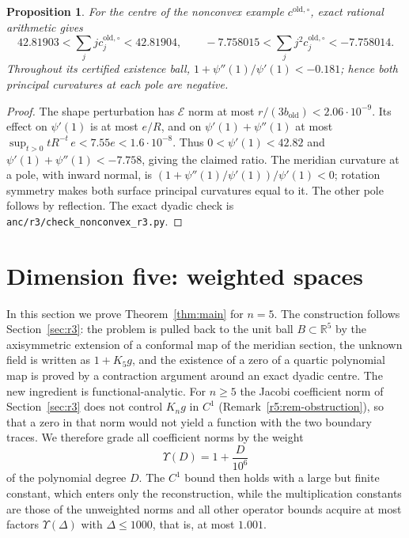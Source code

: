 \documentclass[11pt]{amsart}
\newtheorem{proposition}[theorem]{Proposition}
\theoremstyle{definition}
\theoremstyle{remark}
\numberwithin{equation}{section}
\newcommand{\R}{\mathbb{R}}
\begin{document}
\begin{proposition}\label{r3:prop-nonconvex}
For the centre of the nonconvex example $c^{\mathrm{old},\circ}$, exact rational arithmetic gives
\[
42.81903<\sum_jjc_j^{\mathrm{old},\circ}<42.81904,\qquad
-7.758015<\sum_jj^2c_j^{\mathrm{old},\circ}<-7.758014.
\]
Throughout its certified existence ball,
$1+\psi''(1)/\psi'(1)<-0.181$; hence both principal curvatures at each pole are negative.
\end{proposition}
\begin{proof}
The shape perturbation has $\mathcal E$ norm at most $r/(3b_{\mathrm{old}})<2.06\cdot10^{-9}$. Its effect on $\psi'(1)$ is at most $e/R$, and on $\psi'(1)+\psi''(1)$ at most $\sup_{t>0}tR^{-t}\,e<7.55e<1.6\cdot10^{-8}$. Thus $0<\psi'(1)<42.82$ and $\psi'(1)+\psi''(1)<-7.758$, giving the claimed ratio. The meridian curvature at a pole, with inward normal, is $(1+\psi''(1)/\psi'(1))/\psi'(1)<0$; rotation symmetry makes both surface principal curvatures equal to it. The other pole follows by reflection. The exact dyadic check is \texttt{anc/r3/check\_nonconvex\_r3.py}.
\end{proof}


\section{Dimension five: weighted spaces}\label{r5:sec}\label{sec:r5}

In this section we prove Theorem~\ref{thm:main} for $n=5$. The construction follows Section~\ref{sec:r3}: the problem is pulled back to the unit ball $B\subset\R^5$ by the axisymmetric extension of a conformal map of the meridian section, the unknown field is written as $1+K_5g$, and the existence of a zero of a quartic polynomial map is proved by a contraction argument around an exact dyadic centre. The new ingredient is functional-analytic. For $n\geq5$ the Jacobi coefficient norm of Section~\ref{sec:r3} does not control $K_ng$ in $C^1$ (Remark~\ref{r5:rem-obstruction}), so that a zero in that norm would not yield a function with the two boundary traces. We therefore grade all coefficient norms by the weight
\[
\Upsilon(D)=1+\frac D{10^6}
\]
of the polynomial degree $D$. The $C^1$ bound then holds with a large but finite constant, which enters only the reconstruction, while the multiplication constants are those of the unweighted norms and all other operator bounds acquire at most factors $\Upsilon(\Delta)$ with $\Delta\leq1000$, that is, at most $1.001$.
\end{document}
